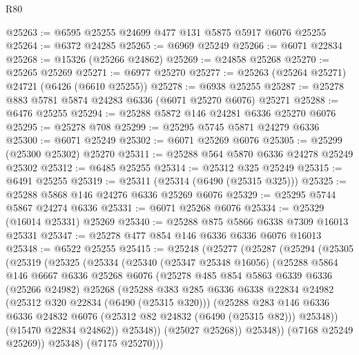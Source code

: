 \begin{lexlean}{R80}
\begin{coremodule}
@25263 := @6595 @25255 @24699 @477 @131 @5875 @5917 @6076 @25255
@25264 := @6372 @24285
@25265 := @6969 @25249
@25266 := @6071 @22834
@25268 := @15326 (@25266 @24862)
@25269 := @24858 @25268
@25270 := @25265 @25269
@25271 := @6977 @25270
@25277 := @25263 (@25264 @25271) @24721 (@6426 (@6610 @25255))
@25278 := @6938 @25255
@25287 := @25278 @883 @5781 @5874 @24283 @6336 (@6071 @25270 @6076) @25271
@25288 := @6476 @25255
@25294 := @25288 @5872 @146 @24281 @6336 @25270 @6076
@25295 := @25278 @708
@25299 := @25295 @5745 @5871 @24279 @6336
@25300 := @6071 @25249
@25302 := @6071 @25269 @6076
@25305 := @25299 (@25300 @25302) @25270
@25311 := @25288 @564 @5870 @6336 @24278 @25249 @25302
@25312 := @6485 @25255
@25314 := @25312 @325 @25249
@25315 := @6491 @25255
@25319 := @25311 (@25314 (@6490 (@25315 @325)))
@25325 := @25288 @5868 @146 @24276 @6336 @25269 @6076
@25329 := @25295 @5744 @5867 @24274 @6336
@25331 := @6071 @25268 @6076
@25334 := @25329 (@16014 @25331) @25269
@25340 := @25288 @875 @5866 @6338 @7309 @16013 @25331
@25347 := @25278 @477 @854 @146 @6336 @6336 @6076 @16013
@25348 := @6522 @25255
@25415 := @25248
    (@25277
      (@25287
        (@25294
          (@25305
            (@25319
              (@25325
                (@25334
                  (@25340
                    (@25347 @25348 @16056)
                    (@25288
                      @5864
                      @146
                      @6667
                      @6336
                      @25268
                      @6076
                      (@25278
                        @485
                        @854
                        @5863
                        @6339
                        @6336
                        (@25266 @24982)
                        @25268
                        (@25288
                          @383
                          @285
                          @6336
                          @6338
                          @22834
                          @24982
                          (@25312 @320 @22834 (@6490 (@25315 @320)))
                          (@25288
                            @283
                            @146
                            @6336
                            @6336
                            @24832
                            @6076
                            (@25312 @82 @24832 (@6490 (@25315 @82)))
                            @25348))
                        (@15470 @22834 @24862))
                      @25348))
                  (@25027 @25268))
                @25348))
            (@7168 @25249 @25269))
          @25348)
        (@7175 @25270)))

\end{coremodule}
\end{lexlean}

